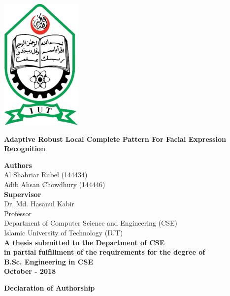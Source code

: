 \documentclass[12pt]{article}
\begin{document}
\begin{center}
\includegraphics[scale=0.70]{1}
\linebreak
\vspace*{-0.4cm}
\begin{LARGE}
\textbf{Adaptive Robust Local Complete Pattern For Facial Expression Recognition}\\
\end{LARGE}
\vspace*{0.9cm}
\textbf{Authors}\\
Al Shahriar Rubel (144434)\\
Adib Ahsan Chowdhury (144446)\\
\vspace*{0.9cm}
\textbf{Supervisor}\\
Dr. Md. Hasanul Kabir\\
Professor\\
Department of Computer Science and Engineering (CSE)\\
Islamic University of Technology (IUT)\\
\vspace*{1.2cm}
\textbf{A thesis submitted to the Department of CSE}\\
\textbf{in partial fulfillment of the requirements for the degree of\\B.Sc. Engineering in CSE}\\
\vspace*{0.7cm}
\textbf{October - 2018}
\end{center}
\newpage
\begin{center}
\begin{large}
\textbf{Declaration of Authorship}
\end{large}
\end{center}
\vspace*{.5cm}
\end{document}
